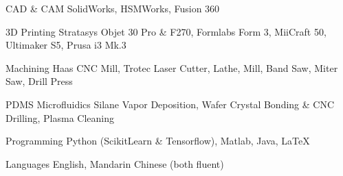 


\begin{cvskills}


\cvskill
{CAD \& CAM} %
{SolidWorks, HSMWorks, Fusion 360} %


\cvskill
{3D Printing} %
{Stratasys Objet 30 Pro \& F270, Formlabs Form 3, MiiCraft 50, Ultimaker S5, Prusa i3 Mk.3} %

\cvskill
{Machining}
{Haas CNC Mill, Trotec Laser Cutter, Lathe, Mill, Band Saw, Miter Saw, Drill Press}

\cvskill
{PDMS Microfluidics}
{Silane Vapor Deposition, Wafer Crystal Bonding \& CNC Drilling, Plasma Cleaning}

\cvskill
{Programming} %
{Python (ScikitLearn \& Tensorflow), Matlab, Java, LaTeX} %

\cvskill
{Languages}
{English, Mandarin Chinese (both fluent)}


\end{cvskills}